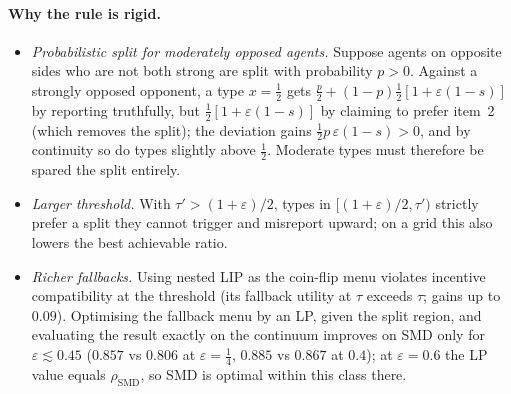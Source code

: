 \paragraph{Why the rule is rigid.}
\begin{itemize}[nosep]
\item \emph{Probabilistic split for moderately opposed agents.} Suppose agents on opposite sides
  who are not both strong are split with probability $p>0$. Against a strongly opposed opponent, a
  type $x=\tfrac12$ gets $\tfrac p2+(1-p)\tfrac12[1+\varepsilon(1-s)]$ by reporting truthfully, but
  $\tfrac12[1+\varepsilon(1-s)]$ by claiming to prefer item~2 (which removes the split); the deviation
  gains $\tfrac12p\,\varepsilon(1-s)>0$, and by continuity so do types slightly above $\tfrac12$. Moderate
  types must therefore be spared the split entirely.
\item \emph{Larger threshold.} With $\tau'>(1+\varepsilon)/2$, types in $[(1+\varepsilon)/2,\tau')$ strictly
  prefer a split they cannot trigger and misreport upward; on a grid this also lowers the best
  achievable ratio.
\item \emph{Richer fallbacks.} Using nested LIP as the coin-flip menu violates incentive
  compatibility at the threshold (its fallback utility at $\tau$ exceeds $\tau$; gains up to $0.09$).
  Optimising the fallback menu by an LP, given the split region, and evaluating the result exactly
  on the continuum improves on SMD only for $\varepsilon\lesssim0.45$ ($0.857$ vs $0.806$ at
  $\varepsilon=\tfrac14$, $0.885$ vs $0.867$ at $0.4$); at $\varepsilon=0.6$ the LP value equals
  $\rho_{\mathrm{SMD}}$, so SMD is optimal within this class there.
\end{itemize}

